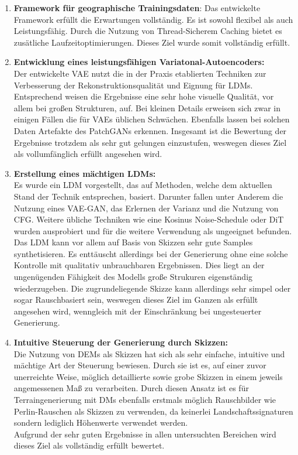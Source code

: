 \begin{enumerate}
    \item \textbf {Framework für geographische Trainingsdaten}:
    Das entwickelte Framework erfüllt die Erwartungen vollständig. Es ist sowohl flexibel als auch Leistungsfähig. Durch die Nutzung von Thread-Sicherem Caching bietet es zusätliche Laufzeitoptimierungen. Dieses Ziel wurde somit vollständig erfüllt.

    \item \textbf {Entwicklung eines leistungsfähigen Variatonal-Autoencoders:} \\
    Der entwickelte \ac{VAE} nutzt die in der Praxis etablierten Techniken zur Verbesserung der Rekonstruktionsqualität und Eignung für \ac{LDM}s. Entsprechend weisen die Ergebnisse eine sehr hohe visuelle Qualität, vor allem bei großen Strukturen, auf. Bei kleinen Details erweisen sich zwar in einigen Fällen die für \ac{VAE}s üblichen Schwächen. Ebenfalls lassen bei solchen Daten Artefakte des PatchGANs erkennen. Insgesamt ist die Bewertung der Ergebnisse trotzdem als sehr gut gelungen einzustufen, weswegen dieses Ziel als vollumfänglich erfüllt angesehen wird. 
    
    \item \textbf {Erstellung eines mächtigen \ac{LDM}s:} \\
    Es wurde ein \ac{LDM} vorgestellt, das auf Methoden, welche dem aktuellen Stand der Technik entsprechen, basiert. Darunter fallen unter Anderem die Nutzung eines VAE-GAN, das Erlernen der Varianz und die Nutzung von \ac{CFG}. Weitere übliche Techniken wie eine Kosinus Noise-Schedule oder \ac{DiT} wurden ausprobiert und für die weitere Verwendung als ungeeignet befunden. \\
    Das \ac{LDM} kann vor allem auf Basis von Skizzen sehr gute Samples synthetisieren. Es enttäuscht allerdings bei der Generierung ohne eine solche Kontrolle mit qualitativ unbrauchbaren Ergebnissen. Dies liegt an der ungenügenden Fähigkeit des Modells große Strukuren eigenständig wiederzugeben. Die zugrundeliegende Skizze kann allerdings sehr simpel oder sogar Rauschbasiert sein, weswegen dieses Ziel im Ganzen als erfüllt angesehen wird, wenngleich mit der Einschränkung bei ungesteuerter Generierung.

    \item \textbf {Intuitive Steuerung der Generierung durch Skizzen:} \\
    Die Nutzung von \ac{DEM}s als Skizzen hat sich als sehr einfache, intuitive und mächtige Art der Steuerung bewiesen. Durch sie ist es, auf einer zuvor unerreichte Weise, möglich detaillierte sowie grobe Skizzen in einem jeweils angemessenen Maß zu verarbeiten. Durch diesen Ansatz ist es für Terraingenerierung mit \ac{DM}s ebenfalls erstmals möglich Rauschbilder wie Perlin-Rauschen als Skizzen zu verwenden, da keinerlei Landschaftssignaturen sondern lediglich Höhenwerte verwendet werden. \\
    Aufgrund der sehr guten Ergebnisse in allen untersuchten Bereichen wird dieses Ziel als vollständig erfüllt bewertet. 


\end{enumerate}
